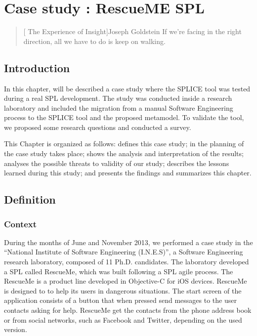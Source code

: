 \chapter{Case study : RescueME SPL}
\label{ch:caseStudy}

\begin{quotation}[ The Experience of Insight]{Joseph Goldstein}
If we're facing in the right direction, all we have to do is keep on walking.
\end{quotation}



\section{ Introduction }
\label{sc:experimentIntroduction}

In this chapter, will be described a case study where the \ac{SPLICE} tool was tested during a real \ac{SPL} development. The study was conducted inside a research laboratory and included the migration from a manual Software Engineering process to the \ac{SPLICE} tool and the proposed metamodel. To validate the tool, we proposed some research questions and conducted a survey. 

This Chapter is organized as follows:  defines this case study; in  the planning of the case study takes place;  shows the analysis and interpretation of the results;  analyses the possible threats  to  validity of our study;  describes the lessons learned during this study; and  presents the findings and summarizes this chapter.

\section{ Definition }
\label{sc:definition}

\subsection{Context}
During the months of June and November 2013, we performed a case study in the “National Institute of Software Engineering (I.N.E.S)”, a Software Engineering research laboratory, composed of 11 Ph.D. candidates. The laboratory developed a \ac{SPL} called RescueMe, which was built following a \ac{SPL} agile process. 
The RescueMe is a product line developed in Objective-C for iOS devices. RescueMe is designed to to help its users in dangerous situations. The start screen of the application consists of a button that when pressed send messages to the user contacts asking for help. RescueMe get the contacts from the phone address book or from social networks, such as Facebook and Twitter, depending on the used version.

